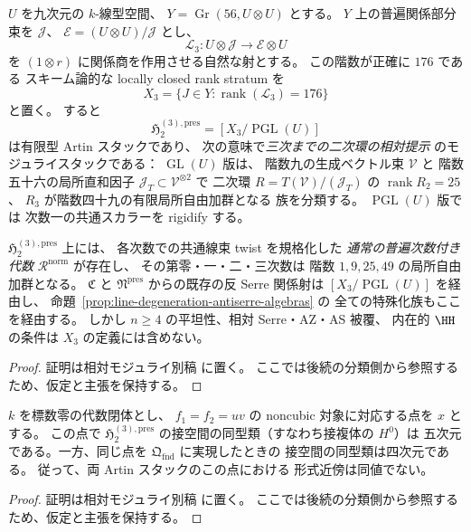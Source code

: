 \begin{proposition}[三次Hilbert値までの相対二次提示のスタック]
\label{prop:truncated-antiserre-moduli-stack}
$U$ を九次元の $k$-線型空間、
$Y=\operatorname{Gr}(56,U\otimes U)$ とする。
$Y$ 上の普遍関係部分束を $\mathcal J$、
$\mathcal E=(U\otimes U)/\mathcal J$ とし、
\[
 \mathcal L_3:
 U\otimes\mathcal J\longrightarrow
 \mathcal E\otimes U
\]
を $(1\otimes r)$ に関係商を作用させる自然な射とする。
この階数が正確に $176$ である
スキーム論的な locally closed rank stratum を
\[
 X_3=\{J\in Y:\operatorname{rank}(\mathcal L_3)=176\}
 \tag{H2-X3}\label{eq:truncated-antiserre-locus}
\]
と置く。
すると
\[
 \boxed{\quad
 \mathfrak H_2^{(3),\mathrm{pres}}
 = [X_3/\operatorname{PGL}(U)]
 \quad}
 \tag{H2-trunc}\label{eq:truncated-antiserre-stack}
\]
は有限型 Artin スタックであり、
次の意味で\emph{三次までの二次環の相対提示}
のモジュライスタックである：
$\operatorname{GL}(U)$ 版は、
階数九の生成ベクトル束 $\mathcal V$ と
階数五十六の局所直和因子
$\mathcal J_T\subset\mathcal V^{\otimes2}$ で
二次環 $R=T(\mathcal V)/(\mathcal J_T)$ の
$\operatorname{rank}R_2=25$、
$R_3$ が階数四十九の有限局所自由加群となる
族を分類する。
$\operatorname{PGL}(U)$ 版では
次数一の共通スカラーを rigidify する。

$\mathfrak H_2^{(3),\mathrm{pres}}$ 上には、
各次数での共通線束 twist を規格化した
\emph{通常の普遍次数付き代数}
$\mathcal R^{\mathrm{norm}}$ が存在し、
その第零・一・二・三次数は
階数 $1,9,25,49$ の局所自由加群となる。
$\mathfrak C$ と $\mathfrak N^{\mathrm{pres}}$
からの既存の反 Serre 関係射は
$[X_3/\operatorname{PGL}(U)]$ を経由し、
命題~\ref{prop:line-degeneration-antiserre-algebras} の
全ての特殊化族もここを経由する。
しかし $n\ge4$ の平坦性、相対 Serre・AZ・AS 被覆、
内在的 $\HH$ の条件は $X_3$ の定義には含めない。
\end{proposition}
\begin{proof}
証明は相対モジュライ別稿 \cite[\texttt{foundation_stack} 節]{QuadricModuli2026} に置く。
ここでは後続の分類側から参照するため、仮定と主張を保持する。
\end{proof}

\begin{proposition}[二根対一致点での一次変形の相違]
\label{prop:truncated-versus-foundation-tangent}
$k$ を標数零の代数閉体とし、
$f_1=f_2=uv$ の noncubic 対象に対応する点を $x$ とする。
この点で $\mathfrak H_2^{(3),\mathrm{pres}}$
の接空間の同型類（すなわち接複体の $H^0$）は
五次元である。一方、同じ点を
$\mathfrak Q_{\mathrm{fnd}}$ に実現したときの
接空間の同型類は四次元である。
従って、両 Artin スタックのこの点における
形式近傍は同値でない。
\end{proposition}
\begin{proof}
証明は相対モジュライ別稿 \cite[\texttt{foundation_stack} 節]{QuadricModuli2026} に置く。
ここでは後続の分類側から参照するため、仮定と主張を保持する。
\end{proof}

